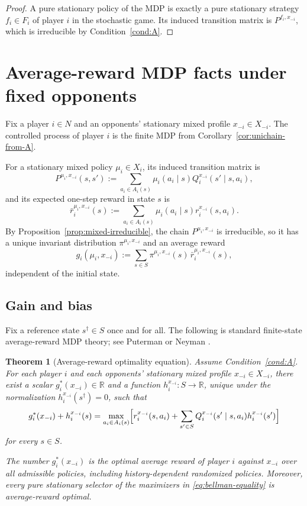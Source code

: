 \documentclass[11pt]{article}
\newtheorem{theorem}{Theorem}[section]
\theoremstyle{definition}
\newcommand{\R}{\mathbb{R}}
\newcommand{\1}{\mathbf{1}}
\begin{document}
\begin{proof}
A pure stationary policy of the MDP is exactly a pure stationary strategy $f_i\in F_i$ of player $i$ in the stochastic game. Its induced transition matrix is $P^{f_i,x_{-i}}$, which is irreducible by Condition~\ref{cond:A}.
\end{proof}

\section{Average-reward MDP facts under fixed opponents}\label{sec:mdp}

Fix a player $i\in N$ and an opponents' stationary mixed profile $x_{-i}\in X_{-i}$. The controlled process of player $i$ is the finite MDP from Corollary~\ref{cor:unichain-from-A}.

For a stationary mixed policy $\mu_i\in X_i$, its induced transition matrix is
\[
P^{\mu_i,x_{-i}}(s,s'):=\sum_{a_i\in A_i(s)}\mu_i(a_i\mid s)
Q_i^{x_{-i}}(s'\mid s,a_i),
\]
and its expected one-step reward in state $s$ is
\[
\bar r_i^{\mu_i,x_{-i}}(s):=\sum_{a_i\in A_i(s)}\mu_i(a_i\mid s)r_i^{x_{-i}}(s,a_i).
\]
By Proposition~\ref{prop:mixed-irreducible}, the chain $P^{\mu_i,x_{-i}}$ is irreducible, so it has a unique invariant distribution $\pi^{\mu_i,x_{-i}}$ and an average reward
\[
g_i(\mu_i,x_{-i})
:=\sum_{s\in S}\pi^{\mu_i,x_{-i}}(s)\,\bar r_i^{\mu_i,x_{-i}}(s),
\]
independent of the initial state.

\subsection{Gain and bias}

Fix a reference state $s^\dagger\in S$ once and for all. The following is standard finite-state average-reward MDP theory; see Puterman \cite[Chapter~8]{Puterman1994} or Neyman \cite[Section~3]{Neyman2003MarkovChains}.

\begin{theorem}[Average-reward optimality equation]\label{thm:aroe}
Assume Condition~\ref{cond:A}. For each player $i$ and each opponents' stationary mixed profile $x_{-i}\in X_{-i}$, there exist a scalar $g_i^*(x_{-i})\in\R$ and a function $h_i^{x_{-i}}:S\to\R$, unique under the normalization $h_i^{x_{-i}}(s^\dagger)=0$, such that
\begin{equation}\label{eq:bellman-equality}
g_i^*(x_{-i})+h_i^{x_{-i}}(s)
=\max_{a_i\in A_i(s)}\Bigl[r_i^{x_{-i}}(s,a_i)+\sum_{s'\in S}Q_i^{x_{-i}}(s'\mid s,a_i)h_i^{x_{-i}}(s')\Bigr]
\end{equation}
for every $s\in S$.

The number $g_i^*(x_{-i})$ is the optimal average reward of player $i$ against $x_{-i}$ over all admissible policies, including history-dependent randomized policies. Moreover, every pure stationary selector of the maximizers in \eqref{eq:bellman-equality} is average-reward optimal.
\end{theorem}
\end{document}
